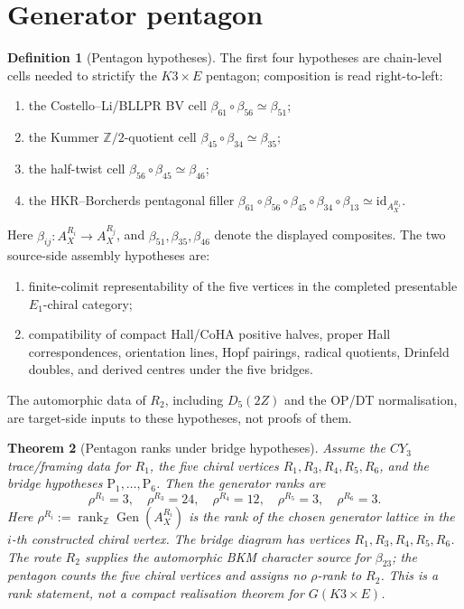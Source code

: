 \documentclass[11pt]{amsart}
\providecommand{\bZ}{\mathbb{Z}}
\newtheorem{theorem}{Theorem}
\theoremstyle{definition}
\newtheorem{definition}[theorem]{Definition}
\theoremstyle{remark}
\begin{document}
\section{Generator pentagon}

\begin{definition}[Pentagon hypotheses]
The first four hypotheses are chain-level cells needed to strictify the
\(K3\times E\) pentagon; composition is read right-to-left:
\begin{enumerate}
\item[\(\mathrm{P}_1\)] the Costello--Li/BLLPR BV cell
\(\beta_{61}\circ\beta_{56}\simeq\beta_{51}\);
\item[\(\mathrm{P}_2\)] the Kummer \(\bZ/2\)-quotient cell
\(\beta_{45}\circ\beta_{34}\simeq\beta_{35}\);
\item[\(\mathrm{P}_3\)] the half-twist cell
\(\beta_{56}\circ\beta_{45}\simeq\beta_{46}\);
\item[\(\mathrm{P}_4\)] the HKR--Borcherds pentagonal filler
\(\beta_{61}\circ\beta_{56}\circ\beta_{45}\circ\beta_{34}\circ\beta_{13}
\simeq\mathrm{id}_{A_X^{R_1}}\).
\end{enumerate}
Here \(\beta_{ij}:A_X^{R_i}\to A_X^{R_j}\), and
\(\beta_{51},\beta_{35},\beta_{46}\) denote the displayed composites.
The two source-side assembly hypotheses are:
\begin{enumerate}
\item[\(\mathrm{P}_5\)] finite-colimit representability of the five
vertices in the completed presentable \(E_1\)-chiral category;
\item[\(\mathrm{P}_6\)] compatibility of compact Hall/CoHA positive
halves, proper Hall correspondences, orientation lines, Hopf pairings,
radical quotients, Drinfeld doubles, and derived centres under the five
bridges.
\end{enumerate}
The automorphic data of \(R_2\), including \(D_5(2Z)\) and the OP/DT
normalisation, are target-side inputs to these hypotheses, not proofs of
them.
\end{definition}

\begin{theorem}[Pentagon ranks under bridge hypotheses]
Assume the \(CY_3\) trace/framing data for \(R_1\), the five chiral
vertices \(R_1,R_3,R_4,R_5,R_6\), and the bridge hypotheses
\(\mathrm{P}_1,\ldots,\mathrm{P}_6\). Then the generator ranks are
\[
        \rho^{R_1}=3,\quad
        \rho^{R_3}=24,\quad
        \rho^{R_4}=12,\quad
        \rho^{R_5}=3,\quad
        \rho^{R_6}=3 .
\]
Here \(\rho^{R_i}:=\operatorname{rank}_{\bZ}\operatorname{Gen}(A_X^{R_i})\)
is the rank of the chosen generator lattice in the \(i\)-th constructed
chiral vertex. The bridge diagram has vertices
\(R_1,R_3,R_4,R_5,R_6\). The route \(R_2\) supplies the automorphic BKM
character source for \(\beta_{23}\); the pentagon counts the five chiral
vertices and assigns no
\(\rho\)-rank to \(R_2\). This is a rank statement, not a compact
realisation theorem for \(G(K3\times E)\).
\end{theorem}
\end{document}
